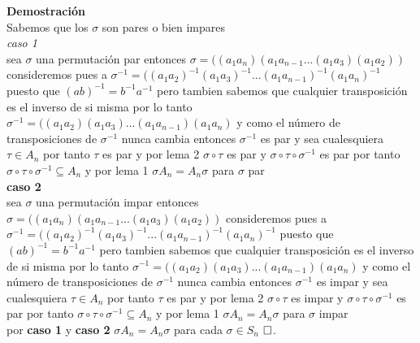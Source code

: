 \documentclass{article}
\begin{document}
\textbf{Demostración}\\
Sabemos que los $\sigma$ son pares o bien impares\\
\newline
\textit{caso 1} \\ sea $\sigma$ una permutación par entonces $\sigma =( (a_{1}a_{n})(a_{1}a_{n-1} ...(a_{1}a_{3})(a_{1}a_{2}) )$ consideremos pues a $\sigma^{-1} = ((a_{1}a_{2})^{-1}(a_{1}a_{3})^{-1}...(a_{1}a_{n-1})^{-1}(a_{1}a_{n})^{-1}$ puesto que $(ab)^{-1}= b^{-1}a^{-1}$ pero tambien sabemos que cualquier transposición es el inverso de si misma por lo tanto $\sigma^{-1} = ((a_{1}a_{2})(a_{1}a_{3})...(a_{1}a_{n-1})(a_{1}a_{n})$ y como el número de transposiciones de $\sigma^{-1}$ nunca cambia entonces $\sigma^{-1}$ es par y sea cualesquiera $\tau \in A_{n}$ por tanto $\tau$ es par y por lema 2 $\sigma \circ \tau$ es par y $\sigma \circ \tau \circ \sigma^{-1}$ es par por tanto $\sigma \circ \tau \circ \sigma^{-1}\subseteq A_{n}$ y por lema 1 $\sigma A_{n} = A_{n} \sigma$ para $\sigma$ par\\
\newline
\textbf{caso 2} \\
sea $\sigma$ una permutación impar entonces $\sigma =( (a_{1}a_{n})(a_{1}a_{n-1} ...(a_{1}a_{3})(a_{1}a_{2}) )$ consideremos pues a $\sigma^{-1} = ((a_{1}a_{2})^{-1}(a_{1}a_{3})^{-1}...(a_{1}a_{n-1})^{-1}(a_{1}a_{n})^{-1}$ puesto que $(ab)^{-1}= b^{-1}a^{-1}$ pero tambien sabemos que cualquier transposición es el inverso de si misma por lo tanto $\sigma^{-1} = ((a_{1}a_{2})(a_{1}a_{3})...(a_{1}a_{n-1})(a_{1}a_{n})$ y como el número de transposiciones de $\sigma^{-1}$ nunca cambia entonces $\sigma^{-1}$ es impar y sea cualesquiera $\tau \in A_{n}$ por tanto $\tau$ es par y por lema 2 $\sigma \circ \tau$ es impar y $\sigma \circ \tau \circ \sigma^{-1}$ es par por tanto $\sigma \circ \tau \circ \sigma^{-1}\subseteq A_{n}$ y por lema 1 $\sigma A_{n} = A_{n} \sigma$ para $\sigma$ impar\\
\newline
por \textbf{caso 1} y \textbf{caso 2} $\sigma A_{n} = A_{n} \sigma$ para cada $\sigma \in S_{n}$ $\hfill\square$.
\end{document}
